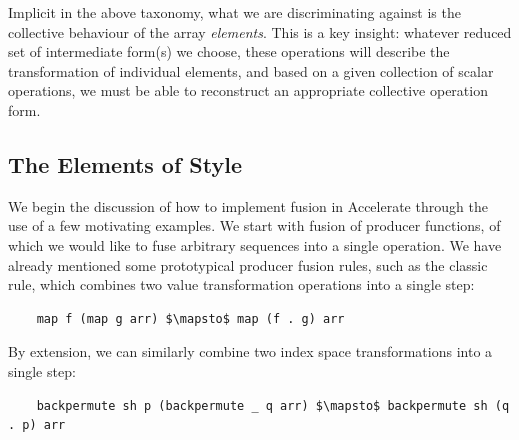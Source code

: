 Implicit in the above taxonomy, what we are discriminating against is the
collective behaviour of the array \emph{elements}. This is a key insight:
whatever reduced set of intermediate form(s) we choose, these operations will
describe the transformation of individual elements, and based on a given
collection of scalar operations, we must be able to reconstruct an appropriate
collective operation form.


\subsection{The Elements of Style}
\label{sec:elements_of_style}

We begin the discussion of how to implement fusion in Accelerate through the use
of a few motivating examples. We start with fusion of producer functions, of
which we would like to fuse arbitrary sequences into a single operation. We have
already mentioned some prototypical producer fusion rules, such as the classic
 rule, which combines two value transformation operations into a
single step:
%
\begin{lstlisting}[style=haskell,numbers=none,mathescape]
%\bf$\langle$ RULE: map/map $\rangle$%
    map f (map g arr) $\mapsto$ map (f . g) arr
\end{lstlisting}
%
By extension, we can similarly combine two index space transformations into a
single step:
%
\begin{lstlisting}[style=haskell,numbers=none,mathescape]
%\bf$\langle$ RULE: backpermute/backpermute $\rangle$%
    backpermute sh p (backpermute _ q arr) $\mapsto$ backpermute sh (q . p) arr
\end{lstlisting}

